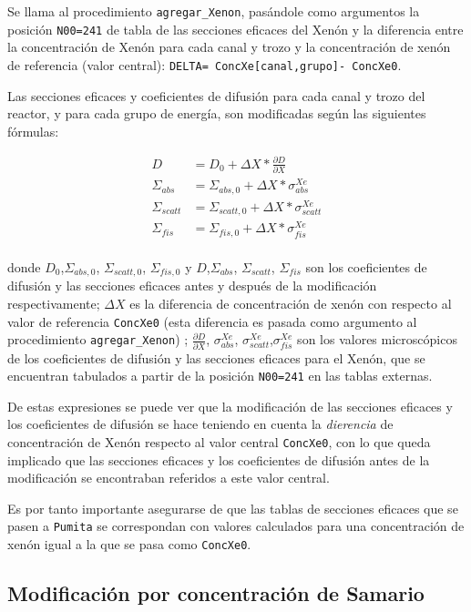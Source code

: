 Se llama al procedimiento \texttt{agregar\_Xenon}, pasándole como argumentos la posición \texttt{N00=241} de tabla de las secciones eficaces del Xenón y la diferencia entre la concentración de Xenón para cada canal y trozo y la concentración de xenón de referencia (valor central): \texttt{DELTA= ConcXe[canal,grupo]- ConcXe0}.

Las secciones eficaces y coeficientes de difusión para cada canal y trozo del reactor, y para cada grupo de energía, son modificadas según las siguientes fórmulas:

\begin{align*}
D &= D_0 + \Delta X * \frac{\partial D}{\partial X}\\	
\Sigma_{abs} &= \Sigma_{abs,0} + \Delta X * \sigma^{Xe}_{abs}\\	
\Sigma_{scatt} &= \Sigma_{scatt,0} + \Delta X * \sigma^{Xe}_{scatt}\\	
\Sigma_{fis} &= \Sigma_{fis,0} + \Delta X * \sigma^{Xe}_{fis}\\
\end{align*}

donde $D_0$,$\Sigma_{abs,0}$, $\Sigma_{scatt,0}$, $\Sigma_{fis,0}$ y $D$,$\Sigma_{abs}$, $\Sigma_{scatt}$, $\Sigma_{fis}$ son los coeficientes de difusión y las secciones eficaces antes y después de la modificación respectivamente; $\Delta X$ es la diferencia de concentración de xenón con respecto al valor de referencia \texttt{ConcXe0} (esta diferencia es pasada como argumento al procedimiento \texttt{agregar\_Xenon}) ; $\frac{\partial D}{\partial X}$, $\sigma^{Xe}_{abs}$, $ \sigma^{Xe}_{scatt}$,$\sigma^{Xe}_{fis}$ son los valores microscópicos de los coeficientes de difusión y las secciones eficaces para el Xenón, que se encuentran tabulados a partir de la posición \texttt{N00=241} en las tablas externas.

De estas expresiones se puede ver que la modificación de las secciones eficaces y los coeficientes de difusión se hace teniendo en cuenta la \emph{dierencia} de concentración de Xenón respecto al valor central \texttt{ConcXe0}, con lo que queda implicado que las secciones eficaces y los coeficientes de difusión antes de la modificación se encontraban referidos a este valor central. 

Es por tanto importante asegurarse de que las tablas de secciones eficaces que se pasen a \texttt{Pumita} se correspondan con valores calculados para una concentración de xenón igual a la que se pasa como \texttt{ConcXe0}.

\subsection{Modificación por concentración de Samario}

